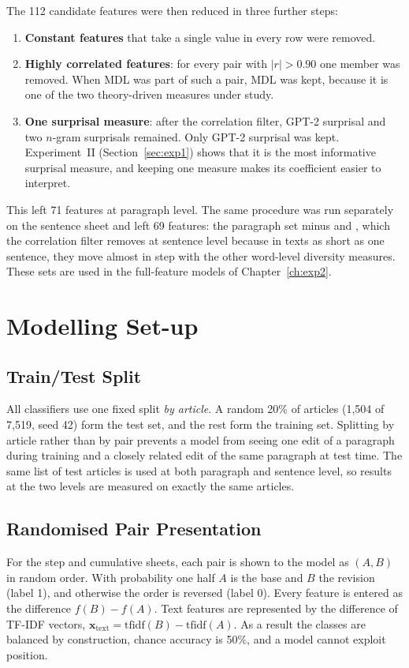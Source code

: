 \documentclass[12pt,a4paper,oneside]{report}
\newcommand{\feat}[1]{\texttt{\detokenize{#1}}}
\begin{document}
The 112 candidate features were then reduced in three further steps:
\begin{enumerate}
  \item \textbf{Constant features} that take a single value in every row were removed.
  \item \textbf{Highly correlated features}: for every pair with $|r| > 0.90$ one member was removed. When MDL was part of such a pair, MDL was kept, because it is one of the two theory-driven measures under study.
  \item \textbf{One surprisal measure}: after the correlation filter, GPT-2 surprisal and two $n$-gram surprisals remained. Only GPT-2 surprisal was kept. Experiment~II (Section~\ref{sec:exp1}) shows that it is the most informative surprisal measure, and keeping one measure makes its coefficient easier to interpret.
\end{enumerate}
This left 71 features at paragraph level. The same procedure was run separately on the sentence sheet and left 69 features: the paragraph set minus \feat{word_msttr} and \feat{word_yulek}, which the correlation filter removes at sentence level because in texts as short as one sentence, they move almost in step with the other word-level diversity measures. These sets are used in the full-feature models of Chapter~\ref{ch:exp2}.

\section{Modelling Set-up}
\label{sec:setup}
\subsection{Train/Test Split}
All classifiers use one fixed split \emph{by article}. A random 20\% of articles (1{,}504 of 7{,}519, seed 42) form the test set, and the rest form the training set. Splitting by article rather than by pair prevents a model from seeing one edit of a paragraph during training and a closely related edit of the same paragraph at test time. The same list of test articles is used at both paragraph and sentence level, so results at the two levels are measured on exactly the same articles.

\subsection{Randomised Pair Presentation}
For the step and cumulative sheets, each pair is shown to the model as $(A, B)$ in random order. With probability one half $A$ is the base and $B$ the revision (label 1), and otherwise the order is reversed (label 0). Every feature is entered as the difference $f(B) - f(A)$. Text features are represented by the difference of TF-IDF vectors, $\mathbf{x}_{\text{text}} = \text{tfidf}(B) - \text{tfidf}(A)$. As a result the classes are balanced by construction, chance accuracy is 50\%, and a model cannot exploit position.
\end{document}
